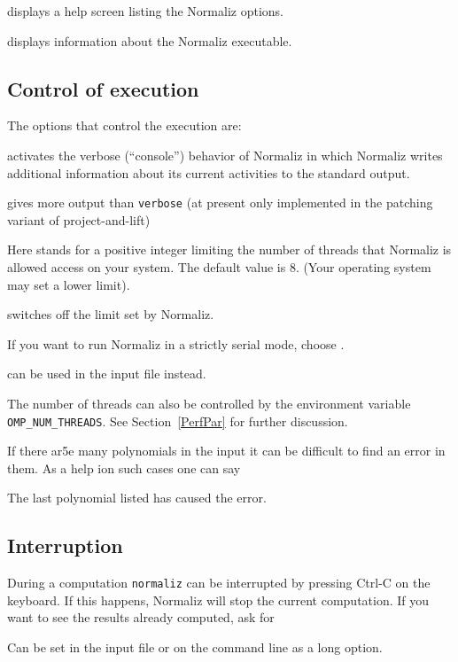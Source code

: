 \begin{itemize}
	\itemtt [-{}-help, -?] displays a help screen listing the Normaliz options.
	
	\itemtt [-{}-version] displays information about the Normaliz executable.
\end{itemize}


\subsection{Control of execution}\label{exec}

The options that control the execution are:

\begin{itemize}
	\itemtt[-{}-verbose, -c] activates the verbose (``console'') behavior of
	Normaliz in which Normaliz writes additional
	information about its current activities to the
	standard output.
	
	\itemtt[-{}-talk] gives more output than \verb*|verbose| (at present only implemented in the patching variant of project-and-lift)
	
	\itemtt[-x=<T>] Here  stands for a positive
	integer limiting the number of threads that Normaliz
	is allowed access on your system. The default value is
	$8$. (Your operating system may set a lower limit).
	
	 switches off the limit set by Normaliz.
	
	If you want to run
	Normaliz in a strictly serial mode, choose
	.

	 can be used in the input file instead.
\end{itemize}

The number of threads can also be controlled by the environment
variable \verb+OMP_NUM_THREADS+. See Section~\ref{PerfPar} for
further discussion.

If there ar5e many polynomials in the input it can be difficult to find an error in them. As a help ion such cases one can say
\begin{itemize}
\end{itemize}
The last polynomial listed has caused the error.

\subsection{Interruption}\label{interrupt}

During a computation \verb|normaliz| can be interrupted by pressing Ctrl-C on the keyboard. If this happens, Normaliz will stop the current computation. If you want to see the results already computed, ask for
\begin{itemize}
\end{itemize}
Can be set in the input file or on the command line as a long option.

